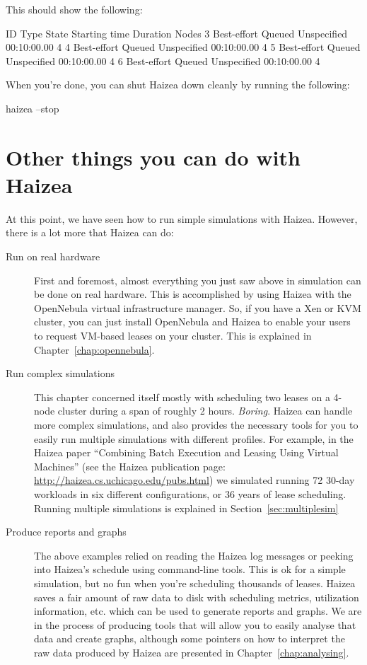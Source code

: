 This should show the following:

\begin{wideshellverbatim}
 ID   Type          State      Starting time           Duration      Nodes  
 3    Best-effort   Queued     Unspecified             00:10:00.00   4       
 4    Best-effort   Queued     Unspecified             00:10:00.00   4       
 5    Best-effort   Queued     Unspecified             00:10:00.00   4       
 6    Best-effort   Queued     Unspecified             00:10:00.00   4       
\end{wideshellverbatim}

When you're done, you can shut Haizea down cleanly by running the following:

\begin{shellverbatim}
haizea --stop
\end{shellverbatim}


\section{Other things you can do with Haizea}

At this point, we have seen how to run simple simulations with Haizea. However, there is a lot more that Haizea can do:

\begin{description}
\item[Run on real hardware] First and foremost, almost everything you just saw above in simulation can be done on real hardware. This is accomplished by using Haizea with the OpenNebula virtual infrastructure manager. So, if you have a Xen or KVM cluster, you can just install OpenNebula and Haizea to enable your users to request VM-based leases on your cluster. This is explained in Chapter~\ref{chap:opennebula}.
\item[Run complex simulations] This chapter concerned itself mostly with scheduling two leases on a 4-node cluster during a span of roughly 2 hours. \emph{Boring}. Haizea can handle more complex simulations, and also provides the necessary tools for you to easily run multiple simulations with different profiles. For example, in the Haizea paper ``Combining Batch Execution and Leasing Using Virtual Machines'' (see the Haizea publication page: \url{http://haizea.cs.uchicago.edu/pubs.html}) we simulated running 72 30-day workloads in six different configurations, or 36 years of lease scheduling. Running multiple simulations is explained in Section~\ref{sec:multiplesim}
\item[Produce reports and graphs] The above examples relied on reading the Haizea log messages or peeking into Haizea's schedule using command-line tools. This is ok for a simple simulation, but no fun when you're scheduling thousands of leases. Haizea saves a fair amount of raw data to disk with scheduling metrics, utilization information, etc. which can be used to generate reports and graphs. We are in the process of producing tools that will allow you to easily analyse that data and create graphs, although some pointers on how to interpret the raw data produced by Haizea are presented in Chapter~\ref{chap:analysing}.
\end{description}